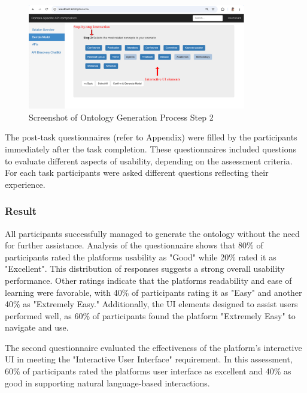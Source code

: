 \begin{figure}[hbt]
\hypertarget{fig:onto.eval.ss2}{%
\centering
\includegraphics[width=0.85\textwidth]{../figures/MyFigures/Ontologygenerationsceenshot.drawio.pdf}
\captionsetup{justification=centering}
\caption{Screenshot of Ontology Generation Process Step 2}\label{fig:onto.eval.ss2}
}
\end{figure}

The post-task questionnaires (refer to Appendix) were filled by the participants immediately after the task completion. These questionnaires included questions to evaluate different aspects of usability, depending on the assessment criteria. For each task participants were asked different questions reflecting their experience. 


\subsubsection*{Result}
All participants successfully managed to generate the ontology without
the need for further assistance. Analysis of the questionnaire shows
that 80\% of participants rated the platform\textquotesingle s usability
as "Good" while 20\% rated it as "Excellent". This distribution of
responses suggests a strong overall usability performance. Other ratings
indicate that the platform\textquotesingle s readability and ease of
learning were favorable, with 40\% of participants rating it as "Easy"
and another 40\% as "Extremely Easy." Additionally, the UI elements
designed to assist users performed well, as 60\% of participants found
the platform "Extremely Easy" to navigate and use.

The second questionnaire evaluated the effectiveness of the platform's
interactive UI in meeting the "Interactive User Interface" requirement.
In this assessment, 60\% of participants rated the
platform\textquotesingle s user interface as excellent and 40\% as good
in supporting natural language-based interactions.

